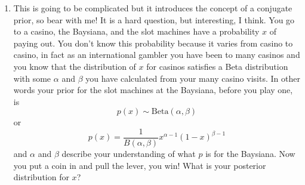 \documentclass[11pt,a4paper]{scrartcl}
\begin{document}
\begin{enumerate}
\item This is going to be complicated but it introduces the concept of
  a conjugate prior, so bear with me! It is a hard question, but
  interesting, I think. You go to a casino, the Baysiana, and the slot
  machines have a probability $x$ of paying out. You don't know this
  probability because it varies from casino to casino, in fact as an
  international gambler you have been to many casinos and you know
  that the distribution of $x$ for casinos satisfies a Beta
  distribution with some $\alpha$ and $\beta$ you have calculated from
  your many casino visits. In other words your prior for the slot
  machines at the Baysiana, before you play one, is
  \begin{equation}
    p(x)\sim \mbox{Beta}(\alpha,\beta)
  \end{equation}
  or
  \begin{equation}
    p(x)=\frac{1}{B(\alpha,\beta)}x^{\alpha-1}(1-x)^{\beta-1}
  \end{equation}
  and $\alpha$ and $\beta$ describe your understanding of what $p$ is
  for the Baysiana. Now you put a coin in and pull the lever, you win!
  What is your posterior distribution for $x$?


  
  
\end{enumerate}
\end{document}
